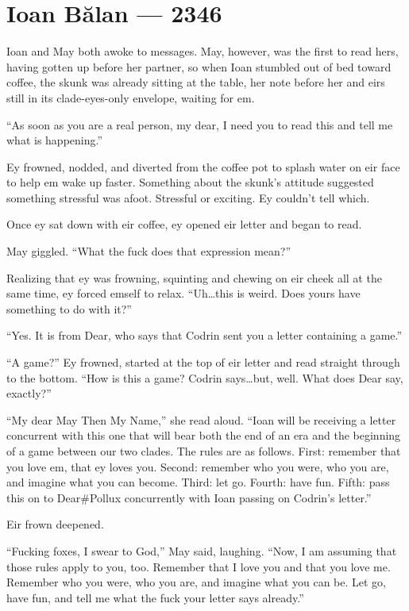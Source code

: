 \hypertarget{ioan-bux103lan-2346}{%
\chapter{Ioan Bălan — 2346}\label{ioan-bux103lan-2346}}

Ioan and May both awoke to messages. May, however, was the first to read hers, having gotten up before her partner, so when Ioan stumbled out of bed toward coffee, the skunk was already sitting at the table, her note before her and eirs still in its clade-eyes-only envelope, waiting for em.

``As soon as you are a real person, my dear, I need you to read this and tell me what is happening.''

Ey frowned, nodded, and diverted from the coffee pot to splash water on eir face to help em wake up faster. Something about the skunk's attitude suggested something stressful was afoot. Stressful or exciting. Ey couldn't tell which.

Once ey sat down with eir coffee, ey opened eir letter and began to read.

May giggled. ``What the fuck does that expression mean?''

Realizing that ey was frowning, squinting and chewing on eir cheek all at the same time, ey forced emself to relax. ``Uh\ldots this is weird. Does yours have something to do with it?''

``Yes. It is from Dear, who says that Codrin sent you a letter containing a game.''

``A game?'' Ey frowned, started at the top of eir letter and read straight through to the bottom. ``How is this a game? Codrin says\ldots but, well. What does Dear say, exactly?''

``My dear May Then My Name,'' she read aloud. ``Ioan will be receiving a letter concurrent with this one that will bear both the end of an era and the beginning of a game between our two clades. The rules are as follows. First: remember that you love em, that ey loves you. Second: remember who you were, who you are, and imagine what you can become. Third: let go. Fourth: have fun. Fifth: pass this on to Dear\#Pollux concurrently with Ioan passing on Codrin's letter.''

Eir frown deepened.

``Fucking foxes, I swear to God,'' May said, laughing. ``Now, I am assuming that those rules apply to you, too. Remember that I love you and that you love me. Remember who you were, who you are, and imagine what you can be. Let go, have fun, and tell me what the fuck your letter says already.''


